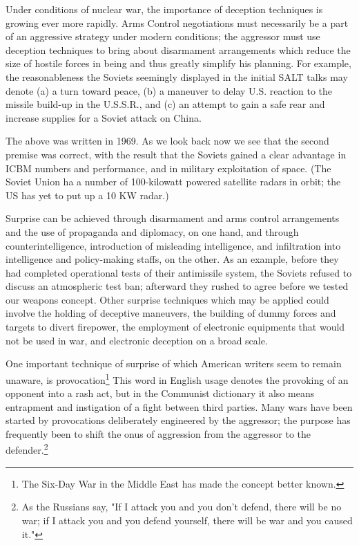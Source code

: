 Under conditions of nuclear war, the importance of deception techniques is growing ever more rapidly. Arms Control negotiations must necessarily be a part of an aggressive strategy under modern conditions; the aggressor must use deception techniques to bring about disarmament arrangements which reduce the size of hostile forces in being and thus greatly simplify his planning. For example, the reasonableness the Soviets seemingly displayed in the initial SALT talks may denote (a) a turn toward peace, (b) a maneuver to delay U.S. reaction to the missile build-up in the U.S.S.R., and (c) an attempt to gain a safe rear and increase supplies for a Soviet attack on China.

The above was written in 1969. As we look back now we see that the second premise was correct, with the result that the Soviets gained a clear advantage in ICBM numbers and performance, and in military exploitation of space. (The Soviet Union ha a number of 100-kilowatt powered satellite radars in orbit; the US has yet to put up a 10 KW radar.)

Surprise can be achieved through disarmament and arms control arrangements and the use of propaganda and diplomacy, on one hand, and through counterintelligence, introduction of misleading intelligence, and infiltration into intelligence and policy-making staffs, on the other. As an example, before they had completed operational tests of their antimissile system, the Soviets refused to discuss an atmospheric test ban; afterward they rushed to agree before we tested our weapons concept. Other surprise techniques which may be applied could involve the holding of deceptive maneuvers, the building of dummy forces and targets to divert firepower, the employment of electronic equipments that would not be used in war, and electronic deception on a broad scale.

One important technique of surprise of which American writers seem to remain unaware, is provocation\footnote{The Six-Day War in the Middle East has made the concept better known.} This word in English usage denotes the provoking of an opponent into a rash act, but in the Communist dictionary it also means entrapment and instigation of a fight between third parties. Many wars have been started by provocations deliberately engineered by the aggressor; the purpose has frequently been to shift the onus of aggression from the aggressor to the defender.\footnote{As the Russians say, "If I attack you and you don't defend, there will be no war; if I attack you and you defend yourself, there will be war and you caused it."} 

